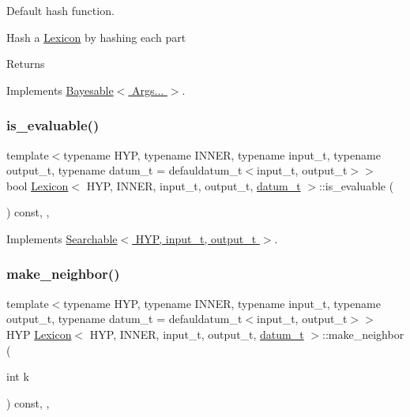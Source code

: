 Default hash function. 

Hash a \hyperlink{class_lexicon}{Lexicon} by hashing each part \begin{DoxyReturn}{Returns}

\end{DoxyReturn}


Implements \hyperlink{class_bayesable_a26f6d55e7526ebd897cbb27c757b611b}{Bayesable$<$ Args... $>$}.

\mbox{\label{class_lexicon_ab9fcefbd8598a5401a39bd59e8043db9}} 
\subsubsection{\texorpdfstring{is\+\_\+evaluable()}{is\_evaluable()}}
{\footnotesize\ttfamily template$<$typename H\+YP, typename I\+N\+N\+ER, typename input\+\_\+t, typename output\+\_\+t, typename datum\+\_\+t = defauldatum\+\_\+t$<$input\+\_\+t, output\+\_\+t$>$$>$ \\
bool \hyperlink{class_lexicon}{Lexicon}$<$ H\+YP, I\+N\+N\+ER, input\+\_\+t, output\+\_\+t, \hyperlink{class_bayesable_a9f1a6c0cd7855550fa10b1a8f13a5867}{datum\+\_\+t} $>$\+::is\+\_\+evaluable (\begin{DoxyParamCaption}{ }\end{DoxyParamCaption}) const\hspace{0.3cm}{\ttfamily [inline]}, {\ttfamily [override]}, {\ttfamily [virtual]}}



Implements \hyperlink{class_searchable_a23786e95730117c3cc4b90e010494a1e}{Searchable$<$ H\+Y\+P, input\+\_\+t, output\+\_\+t $>$}.

\mbox{\label{class_lexicon_a88a02f88387f436c6ff4c060735291ea}} 
\subsubsection{\texorpdfstring{make\+\_\+neighbor()}{make\_neighbor()}}
{\footnotesize\ttfamily template$<$typename H\+YP, typename I\+N\+N\+ER, typename input\+\_\+t, typename output\+\_\+t, typename datum\+\_\+t = defauldatum\+\_\+t$<$input\+\_\+t, output\+\_\+t$>$$>$ \\
H\+YP \hyperlink{class_lexicon}{Lexicon}$<$ H\+YP, I\+N\+N\+ER, input\+\_\+t, output\+\_\+t, \hyperlink{class_bayesable_a9f1a6c0cd7855550fa10b1a8f13a5867}{datum\+\_\+t} $>$\+::make\+\_\+neighbor (\begin{DoxyParamCaption}\item[{int}]{k }\end{DoxyParamCaption}) const\hspace{0.3cm}{\ttfamily [inline]}, {\ttfamily [override]}, {\ttfamily [virtual]}}



